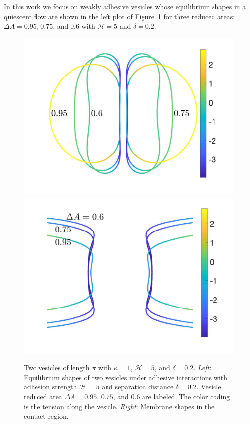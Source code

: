 \documentclass[prf,superscriptaddress,showpacs]{revtex4-1}
\begin{document}
In this work we focus on weakly adhesive vesicles whose equilibrium
shapes in a quiescent flow are shown in the left plot of
Figure~\ref{fig:Dec18_vesicle_shape} for three reduced areas: $\Delta
A=0.95$, $0.75$, and $0.6$ with $\mathcal{H}=5$ and $\delta = 0.2$. 
\begin{figure}
  \includegraphics[keepaspectratio=true,scale=0.175]{figs/Dec18_vesicle_shape_vs_rA_00.jpeg}
  \includegraphics[keepaspectratio=true,scale=0.175]{figs/Dec18_vesicle_shape_vs_rA_01.jpeg}
  \caption{\label{fig:Dec18_vesicle_shape} Two vesicles of length $\pi$
  with $\kappa=1$, $\mathcal{H}=5$, and $\delta=0.2$.  {\em Left}:
  Equilibrium shapes of two vesicles under adhesive interactions with
  adhesion strength $\mathcal{H}=5$ and separation distance
  $\delta=0.2$.  Vesicle reduced area $\Delta A=0.95$, $0.75$, and $0.6$
  are labeled.  The color coding is the tension along the vesicle. {\em
  Right}: Membrane shapes in the contact region.} 
\end{figure}
\end{document}

